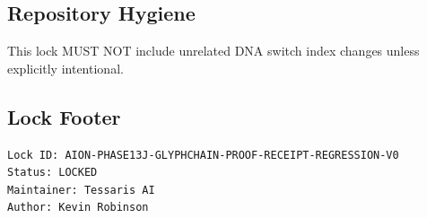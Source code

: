 \subsection{Repository Hygiene}

This lock MUST NOT include unrelated DNA switch index changes unless explicitly intentional.

\subsection{Lock Footer}

\begin{verbatim}
Lock ID: AION-PHASE13J-GLYPHCHAIN-PROOF-RECEIPT-REGRESSION-V0
Status: LOCKED
Maintainer: Tessaris AI
Author: Kevin Robinson
\end{verbatim}
